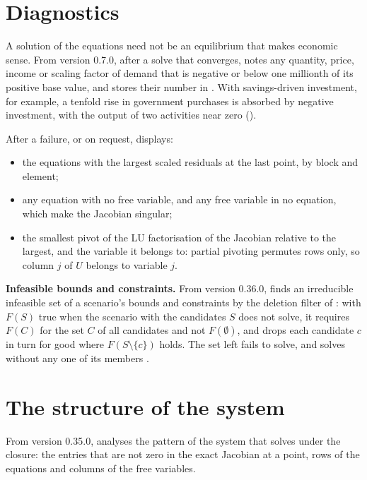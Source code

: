 \section{Diagnostics}\label{sec:diagnostics}

A solution of the equations need not be an equilibrium that makes economic
sense. From version 0.7.0, after a solve that converges, 
notes any quantity, price, income or scaling factor of demand that is
negative or below one millionth of its positive base value, and stores their
number in . With savings-driven investment, for example,
a tenfold rise in government purchases is absorbed by negative investment,
with the output of two activities near zero ().

After a failure, or on request,  displays:
\begin{itemize}
\item the equations with the largest scaled residuals at the last point, by
block and element;
\item any equation with no free variable, and any free variable in no
equation, which make the Jacobian singular;
\item the smallest pivot of the LU factorisation of the Jacobian relative to
the largest, and the variable it belongs to: partial pivoting permutes rows
only, so column $j$ of $U$ belongs to variable $j$.
\end{itemize}

\textbf{Infeasible bounds and constraints.} From version 0.36.0,
 finds an irreducible infeasible set of a scenario's bounds
and constraints by the deletion filter of \citet{chinneck1991}: with $F(S)$
true when the scenario with the candidates $S$ does not solve, it requires
$F(C)$ for the set $C$ of all candidates and not $F(\emptyset)$, and drops
each candidate $c$ in turn for good where $F(S \setminus \{c\})$ holds. The
set left fails to solve, and solves without any one of its members
\citep{chinneck2008}.

\section{The structure of the system}\label{sec:structure}

From version 0.35.0,  analyses the pattern of the
system that  solves under the closure: the entries that
are not zero in the exact Jacobian at a point, rows of the equations and
columns of the free variables.

